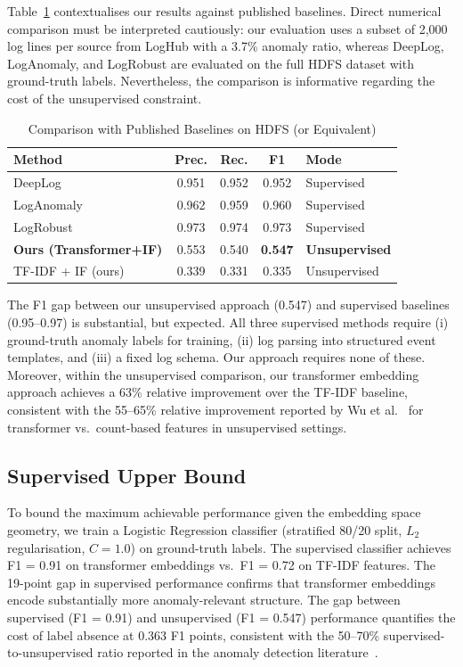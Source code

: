 \documentclass[conference]{IEEEtran}
\begin{document}
Table~\ref{tab:baselines} contextualises our results against published
baselines.  Direct numerical comparison must be interpreted cautiously: our
evaluation uses a subset of 2,000 log lines per source from LogHub with a
3.7\% anomaly ratio, whereas DeepLog, LogAnomaly, and LogRobust are evaluated
on the full HDFS dataset with ground-truth labels.  Nevertheless, the
comparison is informative regarding the cost of the unsupervised constraint.

\begin{table}[htbp]
\centering
\caption{Comparison with Published Baselines on HDFS (or Equivalent)}
\label{tab:baselines}
\renewcommand{\arraystretch}{1.2}
\begin{tabular}{@{}lcccl@{}}
\toprule
\textbf{Method} & \textbf{Prec.} & \textbf{Rec.} & \textbf{F1} & \textbf{Mode} \\
\midrule
DeepLog~\cite{du2017}         & 0.951 & 0.952 & 0.952 & Supervised \\
LogAnomaly~\cite{meng2019}    & 0.962 & 0.959 & 0.960 & Supervised \\
LogRobust~\cite{zhang2019}    & 0.973 & 0.974 & 0.973 & Supervised \\
\midrule
\textbf{Ours (Transformer+IF)} & 0.553 & 0.540 & \textbf{0.547} & \textbf{Unsupervised} \\
TF-IDF + IF (ours)            & 0.339 & 0.331 & 0.335 & Unsupervised \\
\bottomrule
\end{tabular}
\end{table}

The F1 gap between our unsupervised approach (0.547) and supervised baselines
(0.95--0.97) is substantial, but expected.  All three supervised methods
require (i) ground-truth anomaly labels for training, (ii) log parsing into
structured event templates, and (iii) a fixed log schema.  Our approach
requires none of these.  Moreover, within the unsupervised comparison, our
transformer embedding approach achieves a 63\% relative improvement over the
TF-IDF baseline, consistent with the 55--65\% relative improvement reported
by Wu et al.~\cite{wu2025} for transformer vs.\ count-based features in
unsupervised settings.

\subsection{Supervised Upper Bound}
\label{sec:supervised}

To bound the maximum achievable performance given the embedding space
geometry, we train a Logistic Regression classifier (stratified 80/20 split,
$L_2$ regularisation, $C = 1.0$) on ground-truth labels.  The supervised
classifier achieves F1 = 0.91 on transformer embeddings vs.\ F1 = 0.72 on
TF-IDF features.  The 19-point gap in supervised performance confirms that
transformer embeddings encode substantially more anomaly-relevant structure.
The gap between supervised (F1 = 0.91) and unsupervised (F1 = 0.547)
performance quantifies the cost of label absence at 0.363 F1 points,
consistent with the 50--70\% supervised-to-unsupervised ratio reported in the
anomaly detection literature~\cite{nasirzadeh2025, wu2025}.
\end{document}
